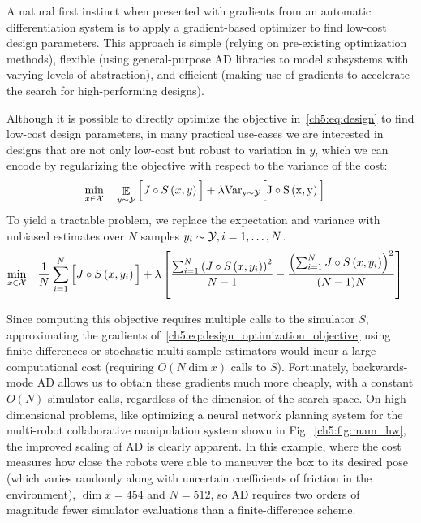 A natural first instinct when presented with gradients from an automatic differentiation system is to apply a gradient-based optimizer to find low-cost design parameters. This approach is simple (relying on pre-existing optimization methods), flexible (using general-purpose AD libraries to model subsystems with varying levels of abstraction), and efficient (making use of gradients to accelerate the search for high-performing designs).

Although it is possible to directly optimize the objective in~\eqref{ch5:eq:design} to find low-cost design parameters, in many practical use-cases we are interested in designs that are not only low-cost but robust to variation in $y$, which we can encode by regularizing the objective with respect to the variance of the cost:
%
\begin{subequations}\label{ch5:eq:design_optimization_nlp_generic}
    \begin{align}
        \min_{x \in \mathcal{X}} & \quad \mathop{\mathbb{E}}_{y \sim \mathcal{Y}} \Big[ J\circ S\left( x, y \right) \Big] + \lambda \rm{Var}_{y\sim\mathcal{Y}}\Big[ J\circ S\left( x, y \right) \Big] \label{ch5:eq:design_optimization_objective_generic}
    \end{align}
\end{subequations}
%
To yield a tractable problem, we replace the expectation and variance with unbiased estimates over $N$ samples $y_i \sim \mathcal{Y}, i=1,\ldots,N$.
%
\begin{subequations}\label{ch5:eq:design_optimization_nlp}
    \begin{align}
        \min_{x \in \mathcal{X}} & \quad \frac{1}{N}\sum_{i=1}^{N} \Big[J\circ S\left( x, y_i \right)\Big] + \lambda \left[ \frac{\sum_{i=1}^N \left( J\circ S\left( x, y_i \right) \right)^2}{N-1} - \frac{\left( \sum_{i=1}^N J\circ S\left( x, y_i \right) \right)^2}{(N-1)N} \right] \label{ch5:eq:design_optimization_objective}
    \end{align}
\end{subequations}

Since computing this objective requires multiple calls to the simulator $S$, approximating the gradients of~\eqref{ch5:eq:design_optimization_objective} using finite-differences or stochastic multi-sample estimators would incur a large computational cost (requiring $O(N\dim{x})$ calls to $S$). Fortunately, backwards-mode AD allows us to obtain these gradients much more cheaply, with a constant $O(N)$ simulator calls, regardless of the dimension of the search space. On high-dimensional problems, like optimizing a neural network planning system for the multi-robot collaborative manipulation system shown in Fig.~\ref{ch5:fig:mam_hw}, the improved scaling of AD is clearly apparent. In this example, where the cost measures how close the robots were able to maneuver the box to its desired pose (which varies randomly along with uncertain coefficients of friction in the environment), $\dim{x} = 454$ and $N = 512$, so AD requires two orders of magnitude fewer simulator evaluations than a finite-difference scheme.

